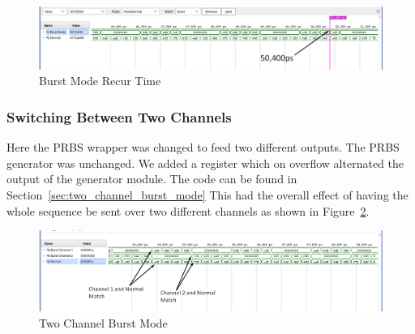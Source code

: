 \begin{figure}[ht]
    \centering
    \hspace*{-3cm}\includegraphics[width=1.4\linewidth]{img/burst_mode_3.png}
    \caption{Burst Mode Recur Time}%
    \label{fig:burst_mode_recur}
\end{figure}


\subsubsection{Switching Between Two Channels}%
\label{ssub:switching_between_two_channels}
Here the PRBS wrapper was changed to feed two different outputs. The PRBS
generator was unchanged. We added a register which on overflow alternated the
output of the generator module. The code can be found in Section~\ref{sec:two_channel_burst_mode} 
This had the overall effect of having the whole sequence be sent over two
different channels as shown in Figure~\ref{fig:two_channel_tx}.


\begin{figure}[ht]
    \centering
    \hspace*{-3cm}\includegraphics[width=1.4\linewidth]{img/two_channel.png}
    \caption{Two Channel Burst Mode}%
    \label{fig:two_channel_tx}
\end{figure}

\cleardoublepage


